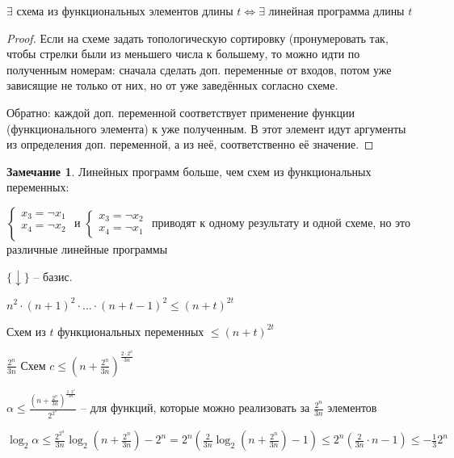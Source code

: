 \documentclass{book}
\theoremstyle{definition}
\newtheorem*{note}{Замечание}
\begin{document}
\begin{theorem}
    $\exists $ схема из функциональных элементов длины $t \iff \exists $ линейная программа длины $t$
\end{theorem}
\begin{proof}
    Если на схеме задать топологическую сортировку (пронумеровать так, чтобы стрелки были из меньшего числа к большему, то можно идти по полученным номерам:  сначала сделать доп. переменные от входов, потом уже зависящие не только от них, но от уже заведённых согласно схеме.

    Обратно: каждой доп. переменной соответствует применение функции (функционального элемента) к уже полученным. В этот элемент идут аргументы из определения доп. переменной, а из неё, соответственно её значение.
\end{proof}
\begin{note}
    Линейных программ больше, чем схем из функциональных переменных:

    $\begin{cases}
        x_3=\neg x_1\\
        x_4=\neg x_2\\
    \end{cases}$ и $\begin{cases}
        x_3=\neg x_2\\
        x_4 = \neg x_1
    \end{cases}$ приводят к одному результату и одной схеме, но это различные линейные программы
\end{note}

$\{\downarrow\}$ -- базис.

$n^2\cdot (n+1)^2 \cdot \ldots\cdot (n+t-1)^2\leqslant (n+t)^{2t}$

\begin{lemma}
    Схем из $t$ функциональных переменных  $\leqslant (n+t)^{2t}$
\end{lemma}

$\frac{2^n}{3n}$ Схем $ c\leqslant \left( n+\frac{2^n}{3n} \right) ^{\frac{2\cdot 2^n}{3n}} $ 

$\alpha\leqslant \frac{\left( n+\frac{2^n}{3n} \right) ^{\frac{2\cdot 2^n}{3n}} }{2^{2^n}} $ -- для функций, которые можно реализовать за $\frac{2^n}{3n}$ элементов

$\log _2\alpha\leqslant \frac{2^{2^n}}{3n}\log _2\left( n+\frac{2^n}{3n} \right) -2^n = 2^n\left( \frac{2}{3n}\log _2\left( n+\frac{2^n}{3n} \right) -1 \right) \leqslant 2^n\left( \frac{2}{3n}\cdot n-1 \right) \leqslant -\frac{1}{3}2^n $ 
\end{document}

